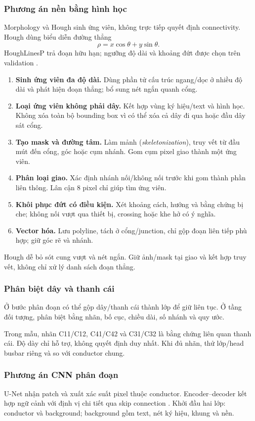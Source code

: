 \documentclass[11pt,a4paper]{article}
\newcommand{\code}[1]{\texttt{\detokenize{#1}}}
\begin{document}
\subsubsection{Phương án nền bằng hình học}
Morphology và Hough sinh ứng viên, không trực tiếp quyết định connectivity. Hough dùng biểu diễn đường thẳng
\begin{equation}
  \rho=x\cos\theta+y\sin\theta.
\end{equation}
HoughLinesP trả đoạn hữu hạn; ngưỡng độ dài và khoảng đứt được chọn trên validation \cite{opencv}.
\begin{enumerate}
  \item \textbf{Sinh ứng viên đa độ dài.} Dùng phần tử cấu trúc ngang/dọc ở nhiều độ dài và phát hiện đoạn thẳng; bổ sung nét ngắn quanh cổng.
  \item \textbf{Loại ứng viên không phải dây.} Kết hợp vùng ký hiệu/text và hình học. Không xóa toàn bộ bounding box vì có thể xóa cả dây đi qua hoặc đầu dây sát cổng.
  \item \textbf{Tạo mask và đường tâm.} Làm mảnh (\emph{skeletonization}), truy vết từ đầu mút đến cổng, góc hoặc cụm nhánh. Gom cụm pixel giao thành một ứng viên.
  \item \textbf{Phân loại giao.} Xác định nhánh nối/không nối trước khi gom thành phần liên thông. Lân cận 8 pixel chỉ giúp tìm ứng viên.
  \item \textbf{Khôi phục đứt có điều kiện.} Xét khoảng cách, hướng và bằng chứng bị che; không nối vượt qua thiết bị, crossing hoặc khe hở có ý nghĩa.
  \item \textbf{Vector hóa.} Lưu polyline, tách ở cổng/junction, chỉ gộp đoạn liên tiếp phù hợp; giữ góc rẽ và nhánh.
\end{enumerate}
Hough dễ bỏ sót cung vượt và nét ngắn. Giữ ảnh/mask tại giao và kết hợp truy vết, không chỉ xử lý danh sách đoạn thẳng.

\subsubsection{Phân biệt dây và thanh cái}
Ở bước phân đoạn có thể gộp dây/thanh cái thành lớp \code{conductor} để giữ liên tục. Ở tầng đối tượng, phân biệt bằng nhãn, bố cục, chiều dài, số nhánh và quy ước.

Trong mẫu, nhãn C11/C12, C41/C42 và C31/C32 là bằng chứng liên quan thanh cái. Độ dày chỉ hỗ trợ, không quyết định duy nhất. Khi đủ nhãn, thử lớp/head busbar riêng và so với conductor chung.

\subsubsection{Phương án CNN phân đoạn}
U-Net nhận patch và xuất xác suất pixel thuộc conductor. Encoder--decoder kết hợp ngữ cảnh với định vị chi tiết qua skip connection \cite{unet}. Khởi đầu hai lớp: conductor và background; background gồm text, nét ký hiệu, khung và nền.
\end{document}
